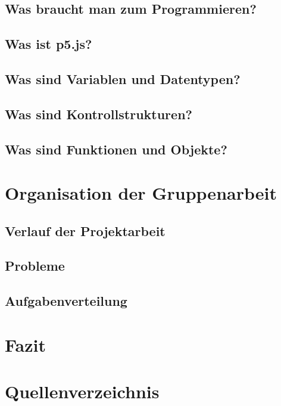 \documentclass[12pt]{report}
\begin{document}
    \section{Was braucht man zum Programmieren?}

    \section{Was ist p5.js?}

    \section{Was sind Variablen und Datentypen?}

    \section{Was sind Kontrollstrukturen?}

    \section{Was sind Funktionen und Objekte?}


    \chapter{Organisation der Gruppenarbeit}

    \section{Verlauf der Projektarbeit}

    \section{Probleme}

    \section{Aufgabenverteilung}


    \chapter{Fazit}

    \chapter{Quellenverzeichnis}
    
\end{document}
